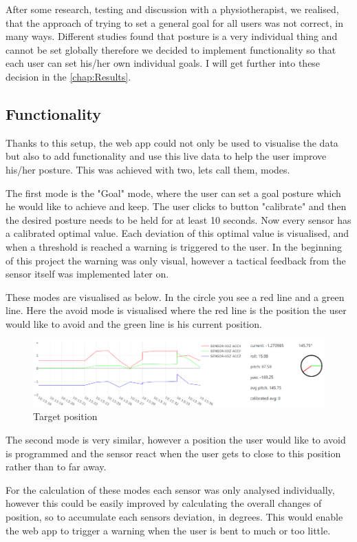 After some research, testing and discussion with a physiotherapist, we realised, that the approach of trying to set a general goal for all users was not correct, in many ways. Different studies found that posture is a very individual thing and cannot be set globally \cite{SitUpSt77:online} therefore we decided to implement functionality so that each user can set his/her own individual goals. I will get further into these decision in the \ref{chap:Results}.

\subsection{Functionality}

Thanks to this setup, the web app could not only be used to visualise the data but also to add functionality and use this live data to help the user improve his/her posture. This was achieved with two, lets call them, modes. 

The first mode is the "Goal" mode, where the user can set a goal posture which he would like to achieve and keep. The user clicks to button "calibrate" and then the desired posture needs to be held for at least 10 seconds. 
Now every sensor has a calibrated optimal value. Each deviation of this optimal value is visualised, and when a threshold is reached a warning is triggered to the user. In the beginning of this project the warning was only visual, however a tactical feedback from the sensor itself was implemented later on.

These modes are visualised as below. In the circle you see a red line and a green line. Here the avoid mode is visualised where the red line is the position the user would like to avoid and the green line is his current position.

\begin{figure}[h]
  \begin{center}
\includegraphics[width=\textwidth]{images/WebAppCircle.png}
  \end{center}
  \caption{Target position}
  \label{fig:BackPos}
\end{figure}

The second mode is very similar, however a position the user would like to avoid is programmed and the sensor react when the user gets to close to this position rather than to far away. 

For the calculation of these modes each sensor was only analysed individually, however this could be easily improved by calculating the overall changes of position, so to accumulate each sensors deviation, in degrees. This would enable the web app to trigger a warning when the user is bent to much or too little.